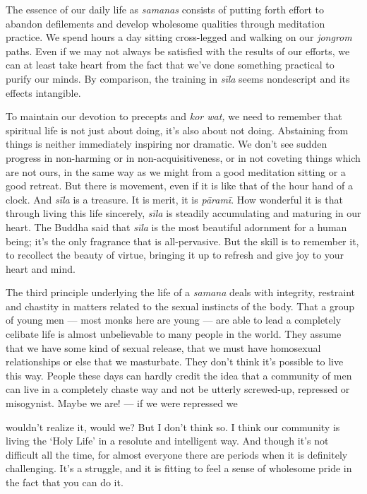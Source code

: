 The essence of our daily life as \emph{samanas} consists of putting
forth effort to abandon defilements and develop wholesome qualities
through meditation practice. We spend hours a day sitting cross-legged
and walking on our \emph{jongrom} paths. Even if we may not always be
satisfied with the results of our efforts, we can at least take heart
from the fact that we've done something practical to purify our minds.
By comparison, the training in \emph{sīla} seems nondescript and its
effects intangible.

To maintain our devotion to precepts and \emph{kor wat,} we need to
remember that spiritual life is not just about doing, it's also about
not doing. Abstaining from things is neither immediately inspiring nor
dramatic. We don't see sudden progress in non-harming or in
non-acquisitiveness, or in not coveting things which are not ours, in
the same way as we might from a good meditation sitting or a good
retreat. But there is movement, even if it is like that of the hour hand
of a clock. And \emph{sīla} is a treasure. It is merit, it is
\emph{pāramī}. How wonderful it is that through living this life
sincerely, \emph{sīla} is steadily accumulating and maturing in our
heart. The Buddha said that \emph{sīla} is the most beautiful adornment
for a human being; it's the only fragrance that is all-pervasive. But
the skill is to remember it, to recollect the beauty of virtue, bringing
it up to refresh and give joy to your heart and mind.

The third principle underlying the life of a \emph{samana} deals with
integrity, restraint and chastity in matters related to the sexual
instincts of the body. That a group of young men --- most monks here are
young --- are able to lead a completely celibate life is almost
unbelievable to many people in the world. They assume that we have some
kind of sexual release, that we must have homosexual relationships or
else that we masturbate. They don't think it's possible to live this
way. People these days can hardly credit the idea that a community of
men can live in a completely chaste way and not be utterly screwed-up,
repressed or misogynist. Maybe we are! --- if we were repressed we

wouldn't realize it, would we? But I don't think so. I think our
community is living the `Holy Life' in a resolute and intelligent way.
And though it's not difficult all the time, for almost everyone there
are periods when it is definitely challenging. It's a struggle, and it
is fitting to feel a sense of wholesome pride in the fact that you can
do it.

